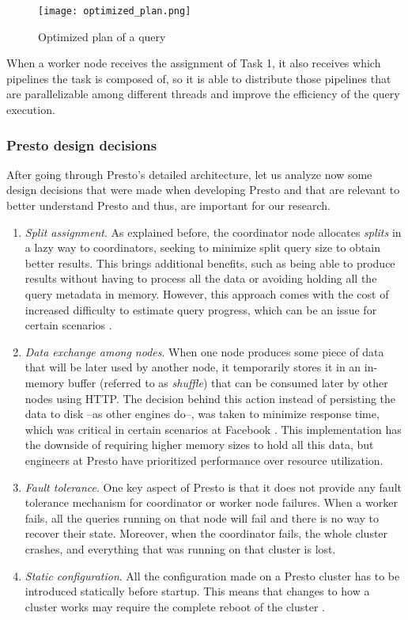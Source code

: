 \documentclass[conference]{IEEEtran}
\begin{document}
\begin{figure}[htbp]
\centerline{\texttt{[image: optimized\_plan.png]}}
\caption{Optimized plan of a query \cite{sethi-2019}}
\label{optimized_plan}
\end{figure}

When a worker node receives the assignment of Task 1, it also receives which pipelines the task is composed of, so it is able to distribute those pipelines that are parallelizable among different threads and improve the efficiency of the query execution.

\subsubsection{Presto design decisions}
After going through Presto's detailed architecture, let us analyze now some design decisions that were made when developing Presto and that are relevant to better understand Presto and thus, are important for our research.

\begin{enumerate}[label=\alph*.]
    \item\textit{Split assignment}. As explained before, the coordinator node allocates \textit{splits} in a lazy way to coordinators, seeking to minimize split query size to obtain better results. This brings additional benefits, such as being able to produce results without having to process all the data or avoiding holding all the query metadata in memory. However, this approach comes with the cost of increased difficulty to estimate query progress, which can be an issue for certain scenarios \cite{sethi-2019}.
    \item\textit{Data exchange among nodes}. When one node produces some piece of data that will be later used by another node, it temporarily stores it in an in-memory buffer (referred to as \textit{shuffle}) that can be consumed later by other nodes using HTTP. The decision behind this action instead of persisting the data to disk –as other engines do–, was taken to minimize response time, which was critical in certain scenarios at Facebook \cite{sethi-2019}. This implementation has the downside of requiring higher memory sizes to hold all this data, but engineers at Presto have prioritized performance over resource utilization.
    \item\textit{Fault tolerance}. One key aspect of Presto is that it does not provide any fault tolerance mechanism for coordinator or worker node failures. When a worker fails, all the queries running on that node will fail and there is no way to recover their state. Moreover, when the coordinator fails, the whole cluster crashes, and everything that was running on that cluster is lost.
    \item\textit{Static configuration}. All the configuration made on a Presto cluster has to be introduced statically before startup. This means that changes to how a cluster works may require the complete reboot of the cluster \cite{sethi-2019}.
\end{enumerate}
\end{document}
